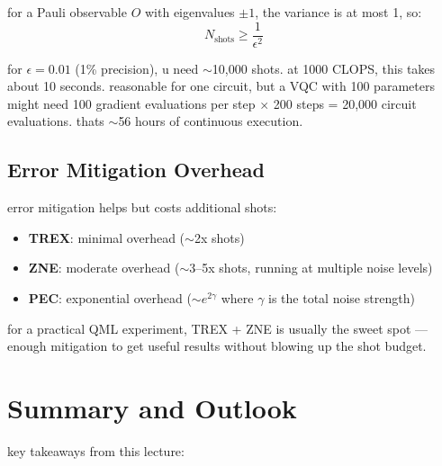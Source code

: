 \documentclass[11pt,a4paper]{article}
\theoremstyle{definition}
\theoremstyle{remark}
\begin{document}
for a Pauli observable $O$ with eigenvalues $\pm 1$, the variance is at most 1, so:
\[
N_{\text{shots}} \geq \frac{1}{\epsilon^2}
\]

for $\epsilon = 0.01$ (1\% precision), u need $\sim$10,000 shots. at 1000 CLOPS, this takes about 10 seconds. reasonable for one circuit, but a VQC with 100 parameters might need 100 gradient evaluations per step $\times$ 200 steps = 20,000 circuit evaluations. thats $\sim$56 hours of continuous execution.

\subsection{Error Mitigation Overhead}

error mitigation helps but costs additional shots:
\begin{itemize}[leftmargin=*]
    \item \textbf{TREX}: minimal overhead ($\sim$2x shots)
    \item \textbf{ZNE}: moderate overhead ($\sim$3--5x shots, running at multiple noise levels)
    \item \textbf{PEC}: exponential overhead ($\sim e^{2\gamma}$ where $\gamma$ is the total noise strength)
\end{itemize}

for a practical QML experiment, TREX + ZNE is usually the sweet spot --- enough mitigation to get useful results without blowing up the shot budget.

\section{Summary and Outlook}

key takeaways from this lecture:
\end{document}
